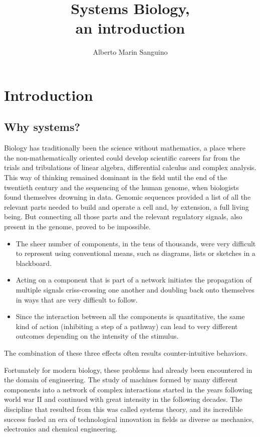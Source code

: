 \documentclass{tufte-book} %
\title{Systems Biology,\\ an introduction}
\author{Alberto Marin Sanguino}
\begin{document}
\setcounter{tocdepth}{2}
\frontmatter
\maketitle
\tableofcontents

\chapter{Introduction}
\section{Why systems?}

Biology has traditionally been the science without mathematics, a place where the non-mathematically oriented  could develop  scientific careers far from the trials and tribulations of linear algebra, differential calculus and complex analysis. This way of thinking remained dominant in the field until the end of the twentieth century and the sequencing of the human genome, when biologists found themselves drowning in data. Genomic sequences provided a list of all the relevant parts needed to build and operate a cell and, by extension, a full living being. But connecting all those parts and the relevant regulatory signals, also present in the genome, proved to be impossible.\begin{itemize}
	\item The sheer number of components, in the tens of thousands, were very difficult to represent using conventional means, such as diagrams, lists or sketches in a blackboard.
	\item Acting on a component that is part of a network initiates the propagation of multiple signals criss-crossing one another and doubling back onto themselves in ways that are very difficult to follow.
	\item Since the interaction between all the components is quantitative, the same kind of action (inhibiting a step of a pathway) can lead to very different outcomes depending on the intensity of the stimulus.
\end{itemize}    

The combination of these three effects often results counter-intuitive behaviors.

Fortunately for modern biology, these problems had already been encountered in the domain of engineering. The study of machines formed by many different components into a network of complex interactions started in the years following world war II and continued with great intensity in the following decades. The discipline that resulted from this was called systems theory, and its incredible success fueled an era of technological innovation in fields as diverse as mechanics, electronics and chemical engineering.
\end{document}
